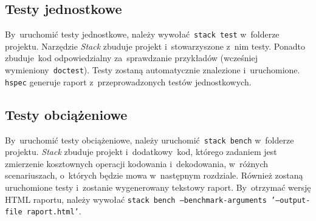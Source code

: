 \documentclass[../../praca.tex]{subfiles}
\begin{document}
\subsection{Testy jednostkowe}

By~uruchomić testy jednostkowe, należy wywołać~\texttt{stack test}
w~folderze projektu. Narzędzie \emph{Stack} zbuduje projekt
i~stowarzyszone z~nim testy. Ponadto zbuduje~kod
odpowiedzialny za~sprawdzanie przykładów (wcześniej
wymieniony~\texttt{doctest}). Testy zostaną automatycznie
znalezione i~uruchomione. \texttt{hspec} 
generuje raport z~przeprowadzonych testów jednostkowych.

\subsection{Testy obciążeniowe}

By~uruchomić testy obciążeniowe, należy uruchomić~\texttt{stack bench}
w~folderze projektu. \emph{Stack} zbuduje projekt
i~dodatkowy~kod, którego zadaniem jest zmierzenie
kosztownych operacji kodowania i~dekodowania,
w~różnych scenariuszach, o~których będzie mowa
w~następnym rozdziale. Również zostaną uruchomione
testy i~zostanie wygenerowany tekstowy raport. 
By~otrzymać wersję HTML raportu, należy wywołać
\texttt{stack bench --benchmark-arguments '--output-file raport.html'}.
\end{document}
